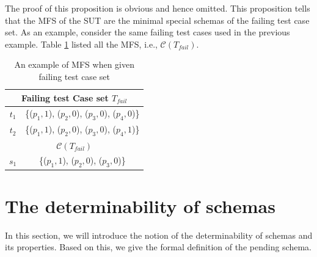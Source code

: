 The proof of this proposition is obvious and hence omitted. This proposition tells that the MFS of the SUT are the minimal special schemas of the failing test case set. As an example, consider the same failing test cases used in the previous example. Table \ref{ex:minimalfaultyschemaspffailingtestset} listed all the MFS, i.e., $\mathcal{C}(T_{fail})$.


\begin{table}[htbp]
  \centering
  \caption{An example of MFS when given failing test case set}
      \label{ex:minimalfaultyschemaspffailingtestset}
    \begin{tabular}{|c|c|} \hline
  \multicolumn{2}{|c|}{\textbf{Failing test Case set $T_{fail}$}} \\ \hline
  $t_{1}$ & \{($p_{1}, 1$), ($p_{2}, 0$), ($p_{3}, 0$), ($p_{4}, 0$)\}\\
  $t_{2}$ & \{($p_{1}, 1$), ($p_{2}, 0$), ($p_{3}, 0$), ($p_{4}, 1$)\}\\ \hline
  \multicolumn{2}{|c|}{\textbf{ $\mathcal{C}(T_{fail})$ }}  \\ \hline
  $s_{1}$ & \{($p_{1}, 1$), ($p_{2}, 0$), ($p_{3}, 0$)\}  \\ \hline
    \end{tabular}%
\end{table}%




\section{The determinability of schemas}\label{sec:pending}
In this section, we will introduce the notion of the determinability of schemas and its properties. Based on this, we give the formal definition of the pending schema.



